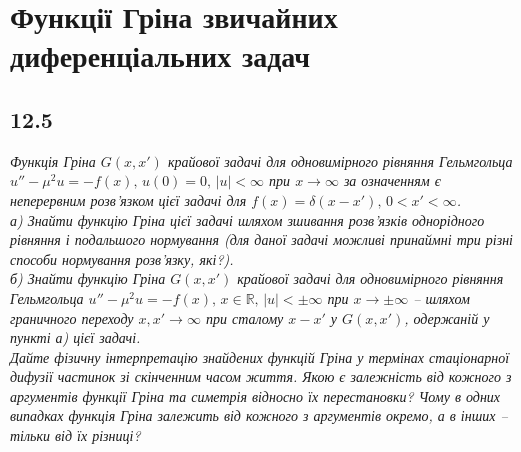 \documentclass[a4paper, 14pt]{extreport}
\begin{document}
\chapter{Функції Гріна звичайних диференціальних задач}

\section[Задача №12.5]{12.5}

\textit{Функція Гріна $G(x,x')$ крайової задачі для одновимірного рівняння Гельмгольца $u'' - \mu^2u = -f(x), \, u(0) = 0, \, |u| < \infty $ при $x \to \infty$ за означенням є неперервним розв’язком цієї задачі для $f(x) = \delta(x-x'), \, 0 < x' < \infty$.\\
а) Знайти функцію Гріна цієї задачі шляхом зшивання розв’язків однорідного рівняння і подальшого нормування (для даної задачі можливі принаймні три різні способи нормування розв’язку, які?).\\
б) Знайти функцію Гріна $G(x,x')$ крайової задачі для одновимірного рівняння Гельмгольца $u'' - \mu^2u = -f(x), \, x \in \mathbb{R}, \, |u| < \pm\infty $ при $x \to \pm\infty$ – шляхом граничного переходу $x, x' \to \infty$ при сталому $x-x'$ у $G(x,x')$, одержаній у пункті а) цієї задачі.\\
Дайте фізичну інтерпретацію знайдених функцій Гріна у термінах стаціонарної дифузії частинок зі скінченним часом життя. Якою є залежність від кожного з аргументів функції Гріна та симетрія відносно їх перестановки? Чому в одних випадках функція Гріна залежить від кожного з аргументів окремо, а в інших – тільки від їх різниці?}
\end{document}
